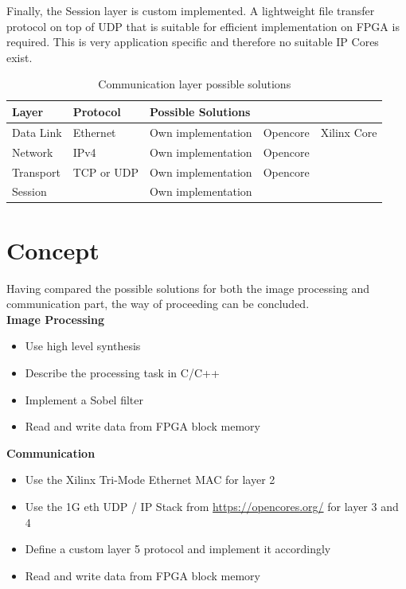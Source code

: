 Finally, the Session layer is custom implemented. A lightweight file transfer
protocol on top of UDP that is suitable for efficient implementation
on FPGA is required. This is very application specific and therefore no suitable IP Cores
exist.

\begin{table}[h!]
    \centering
    \begin{tabular}{l l l l l}
        \toprule
        Layer & Protocol & Possible Solutions & & \\
        \midrule
        Data Link & Ethernet & 
        Own implementation & Opencore & Xilinx Core
        \\
        Network & IPv4 &
        Own implementation & Opencore & 
        \\
        Transport & TCP or UDP &
        Own implementation & Opencore & 
        \\
        Session & {} &
        Own implementation & &
        \\
        \bottomrule
    \end{tabular}
    \caption{Communication layer possible solutions}
    \label{tab:commsol}
\end{table}

%
%
\clearpage
\section{Concept} \label{chapt:mission:concept}
Having compared the possible solutions for both the image processing and
communication part, the way of proceeding can be concluded.
\\

\textbf{Image Processing}
    \begin{itemize}
        \item Use high level synthesis
        \item Describe the processing task in C/C++
        \item Implement a Sobel filter
        \item Read and write data from FPGA block memory
    \end{itemize}

\textbf{Communication} 
    \begin{itemize}
        \item Use the Xilinx Tri-Mode Ethernet MAC for layer 2
        \item Use the 1G eth UDP / IP Stack from 
        \url{https://opencores.org/} for layer 3 and 4
        \item Define a custom layer 5 protocol and implement it accordingly
        \item Read and write data from FPGA block memory
    \end{itemize}

